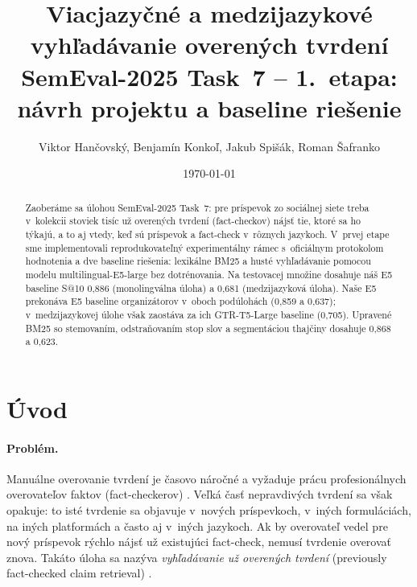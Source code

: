 \documentclass[11pt,a4paper]{article}
\title{Viacjazyčné a medzijazykové vyhľadávanie overených tvrdení\\
\large SemEval-2025 Task~7 -- 1.~etapa: návrh projektu a baseline riešenie}
\author{Viktor Hančovský, Benjamín Konkoľ, Jakub Spišák, Roman Šafranko}
\date{\today}
\makeatletter
\newcommand{\sat}{S@10}
\makeatother
\begin{document}
\maketitle

\begin{abstract}
Zaoberáme sa úlohou SemEval-2025 Task~7: pre príspevok zo sociálnej siete treba v~kolekcii stoviek tisíc už overených tvrdení (fact-checkov) nájsť tie, ktoré sa ho týkajú, a to aj vtedy, keď sú príspevok a fact-check v~rôznych jazykoch.
V~prvej etape sme implementovali reprodukovateľný experimentálny rámec s~oficiálnym protokolom hodnotenia a dve baseline riešenia: lexikálne BM25 a husté vyhľadávanie pomocou modelu multilingual-E5-large bez dotrénovania.
Na testovacej množine dosahuje náš E5 baseline \sat{} 0{,}886 (monolingválna úloha) a 0{,}681 (medzijazyková úloha).
Naše E5 prekonáva E5 baseline organizátorov v~oboch podúlohách (0{,}859 a 0{,}637); v~medzijazykovej úlohe však zaostáva za ich GTR-T5-Large baseline (0{,}705).
Upravené BM25 so stemovaním, odstraňovaním stop slov a segmentáciou thajčiny dosahuje 0{,}868 a 0{,}623.
\end{abstract}

\section{Úvod}
\label{sec:intro}

\paragraph{Problém.}
Manuálne overovanie tvrdení je časovo náročné a vyžaduje prácu profesionálnych overovateľov faktov (fact-checkerov) \citep{shaar-etal-2020-known}.
Veľká časť nepravdivých tvrdení sa však opakuje: to isté tvrdenie sa objavuje v~nových príspevkoch, v~iných formuláciách, na iných platformách a často aj v~iných jazykoch.
Ak by overovateľ vedel pre nový príspevok rýchlo nájsť už existujúci fact-check, nemusí tvrdenie overovať znova.
Takáto úloha sa nazýva \emph{vyhľadávanie už overených tvrdení} (previously fact-checked claim retrieval) \citep{shaar-etal-2020-known}.
\end{document}
